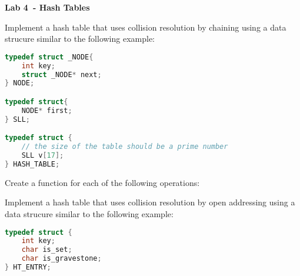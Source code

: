 \documentclass{exam}
\newcommand\labnr{4}
\newcommand\lab{Lab \labnr\ - Hash Tables}
\newcommand\lvlez{$\bigstar$}
\newcommand\lvlmed{\lvlez\lvlez}
\begin{document}
\begin{center}
    \vspace*{0cm}
    \bfseries\LARGE
    \lab
    \vspace*{1cm}
\end{center}


\begin{questions}
\question Implement a hash table that uses collision resolution by chaining using a data strucure similar to the following example:

\begin{lstlisting}[language=C]
typedef struct _NODE{
    int key;
    struct _NODE* next;
} NODE;

typedef struct{
    NODE* first;   
} SLL;

typedef struct {
    // the size of the table should be a prime number 
    SLL v[17];
} HASH_TABLE;
\end{lstlisting}



Create a function for each of the following operations:

\question Implement a hash table that uses collision resolution by open addressing using a data strucure similar to the following example:

\begin{lstlisting}[language=C]
typedef struct {
    int key;
    char is_set;
    char is_gravestone;
} HT_ENTRY;


\end{lstlisting}
\end{questions}
\end{document}
